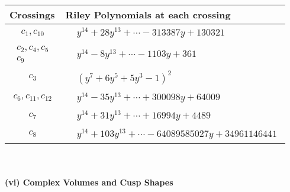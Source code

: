 \documentclass[1p]{elsarticle_modified}
\theoremstyle{definition}
\begin{document}
\begin{tabular}{m{50pt}|m{274pt}}
Crossings & \hspace{64pt}Riley Polynomials at each crossing \\
\hline $$\begin{aligned}c_{1},c_{10}\end{aligned}$$&$\begin{aligned}
&y^{14}+28 y^{13}+\cdots-313387 y+130321
\end{aligned}$\\
\hline $$\begin{aligned}c_{2},c_{4},c_{5}\\c_{9}\end{aligned}$$&$\begin{aligned}
&y^{14}-8 y^{13}+\cdots-1103 y+361
\end{aligned}$\\
\hline $$\begin{aligned}c_{3}\end{aligned}$$&$\begin{aligned}
&(y^7+6 y^5+5 y^3-1)^2
\end{aligned}$\\
\hline $$\begin{aligned}c_{6},c_{11},c_{12}\end{aligned}$$&$\begin{aligned}
&y^{14}-35 y^{13}+\cdots+300098 y+64009
\end{aligned}$\\
\hline $$\begin{aligned}c_{7}\end{aligned}$$&$\begin{aligned}
&y^{14}+31 y^{13}+\cdots+16994 y+4489
\end{aligned}$\\
\hline $$\begin{aligned}c_{8}\end{aligned}$$&$\begin{aligned}
&y^{14}+103 y^{13}+\cdots-64089585027 y+34961146441
\end{aligned}$\\
\hline
\end{tabular}\\~\\
\newpage\flushleft \textbf{(vi) Complex Volumes and Cusp Shapes}
\end{document}
